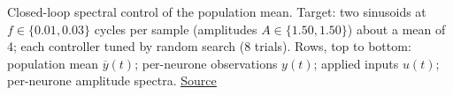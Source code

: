 Closed-loop spectral control of the population mean. Target: two sinusoids at $f \in \{0.01, 0.03\}$ cycles per sample (amplitudes $A \in \{1.50, 1.50\}$) about a mean of 4; each controller tuned by random search (8 trials). Rows, top to bottom: population mean $\overline{y}(t)$; per-neurone observations $y(t)$; applied inputs $u(t)$; per-neurone amplitude spectra. \href{https://github.com/tahmidazam/gg4/blob/main/notebooks/spectral_control/spectral_control.ipynb}{\underline{Source}}%
